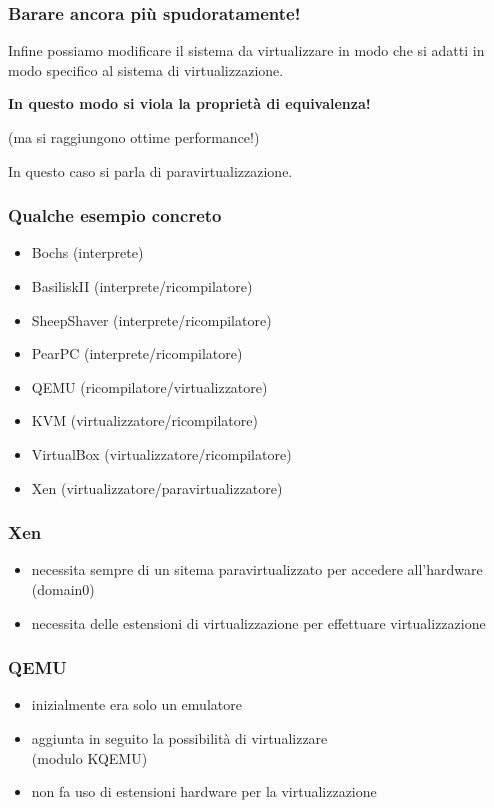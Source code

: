 \documentclass[ignorenonframetext]{beamer}
\begin{document}
  \begin{frame}
  \frametitle{Barare ancora più spudoratamente!}
  Infine possiamo modificare il sistema da virtualizzare in modo che si
  adatti in modo specifico al sistema di virtualizzazione.
  
  \textbf{In questo modo si viola la proprietà di equivalenza!}
  
  {\scriptsize (ma si raggiungono ottime performance!)}
  
  In questo caso si parla di paravirtualizzazione.
  \end{frame}
  
  \begin{frame}
  \frametitle{Qualche esempio concreto}
  \begin{itemize}
  \item Bochs (interprete)
  \item BasiliskII (interprete/ricompilatore)
  \item SheepShaver (interprete/ricompilatore)
  \item PearPC (interprete/ricompilatore)
  \item QEMU (ricompilatore/virtualizzatore)
  \item KVM (virtualizzatore/ricompilatore)
  \item VirtualBox (virtualizzatore/ricompilatore)
  \item Xen (virtualizzatore/paravirtualizzatore)
  \end{itemize}
  \end{frame}
  
  \begin{frame}
  \frametitle{Xen}
  \begin{itemize}
  \item necessita sempre di un sitema paravirtualizzato per accedere
  all'hardware (domain0)
  \item necessita delle estensioni di virtualizzazione per effettuare
  virtualizzazione
  \end{itemize} 
  \end{frame}
  
  \begin{frame}
  \frametitle{QEMU}
  \begin{itemize}
  \item inizialmente era solo un emulatore
  \item aggiunta in seguito la possibilità di virtualizzare\\ (modulo KQEMU)
  \item non fa uso di estensioni hardware per la virtualizzazione
  \end{itemize}
  \end{frame}
\end{document}
